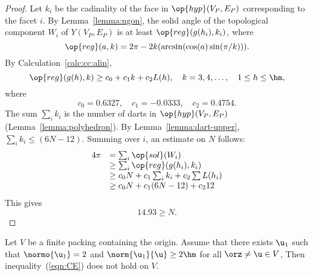 \begin{proof}
Let $k_i$ be the cadinality of the face in $\op{hyp}(V_P,E_P)$
corresponding to the facet $i$.  By Lemma~\ref{lemma:ngon}, the solid
angle of the topological component $W_i$ of $Y(V_P,E_P)$ is at least
$\op{reg}(g(h_i),k_i)$, where %
%
%
\begin{displaymath}
\op{reg}(a,k) = 2\pi - 2 k (\arcsin(\cos(a)\sin(\pi/k))).
\end{displaymath}
By Calculation~\ref{calc:cc:alin}, %
\begin{displaymath}
\op{reg}(g(h),k) \ge c_0 + c_1 k + c_2 L(h),\quad
k = 3,4,\ldots,\quad 1\le h\le \hm,
\end{displaymath}
where
\begin{displaymath}c_0 = 0.6327,\quad c_1 = -0.0333,\quad c_2 =
0.4754.\end{displaymath} The sum $\sum_i k_i$ is the number of darts
in $\op{hyp}(V_P,E_P)$ (Lemma~\ref{lemma:polyhedron}).  By
Lemma~\ref{lemma:dart-upper}, $\sum_i k_i \le (6N-12)$.  Summing over
$i$, an estimate on $N$ follows: %
%
\begin{displaymath}
\begin{array}{lll}
4\pi &= \sum_i\op{sol}(W_i)\\
&\ge \sum_i \op{reg}(g(h_i),k_i) \\
&\ge c_0 N +c_1\sum_i k_i + c_2 \sum L(h_i)\\
&\ge c_0 N +c_1 (6N-12) + c_2 12\\
\end{array}
\end{displaymath}
This gives
\begin{displaymath}
14.93 \ge N.
\end{displaymath}
\end{proof} 


\begin{lemma}\label{300}\label{lemma:D'}  
Let $ V$ be a finite packing containing the origin.
Assume that there exists $ \u_1$ such that $\normo{ \u_1}=2$ and
$\norm{ \u_1}{ \u}\ge 2\hm$ for all $\orz\ne \u\in V$,
Then  inequality~(\ref{eqn:CE}) does not hold on $ V$.
\end{lemma}

